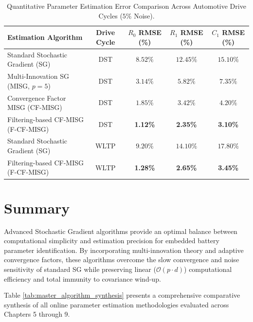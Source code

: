 \begin{table}[h!]
\centering
\small
\renewcommand{\arraystretch}{1.15}
\caption{Quantitative Parameter Estimation Error Comparison Across Automotive Drive Cycles ($5\%$ Noise).}
\label{tab:driving_cycle_performance}
\begin{tabularx}{\textwidth}{|X|c|c|c|c|}
\hline
\textbf{Estimation Algorithm} & \textbf{Drive Cycle} & \textbf{$R_0$ RMSE (\%)} & \textbf{$R_1$ RMSE (\%)} & \textbf{$C_1$ RMSE (\%)} \\ \hline
Standard Stochastic Gradient (SG) & DST & $8.52\%$ & $12.45\%$ & $15.10\%$ \\ \hline
Multi-Innovation SG (MISG, $p=5$) & DST & $3.14\%$ & $5.82\%$ & $7.35\%$ \\ \hline
Convergence Factor MISG (CF-MISG) & DST & $1.85\%$ & $3.42\%$ & $4.20\%$ \\ \hline
Filtering-based CF-MISG (F-CF-MISG) & DST & \textbf{1.12\%} & \textbf{2.35\%} & \textbf{3.10\%} \\ \hline \hline
Standard Stochastic Gradient (SG) & WLTP & $9.20\%$ & $14.10\%$ & $17.80\%$ \\ \hline
Filtering-based CF-MISG (F-CF-MISG) & WLTP & \textbf{1.28\%} & \textbf{2.65\%} & \textbf{3.45\%} \\ \hline
\end{tabularx}
\end{table}


\section{Summary}
\label{sec:sg_summary}

Advanced Stochastic Gradient algorithms provide an optimal balance between computational simplicity and estimation precision for embedded battery parameter identification. By incorporating multi-innovation theory and adaptive convergence factors, these algorithms overcome the slow convergence and noise sensitivity of standard SG while preserving linear ($\mathcal{O}(p \cdot d)$) computational efficiency and total immunity to covariance wind-up.

Table \ref{tab:master_algorithm_synthesis} presents a comprehensive comparative synthesis of all online parameter estimation methodologies evaluated across Chapters 5 through 9.

